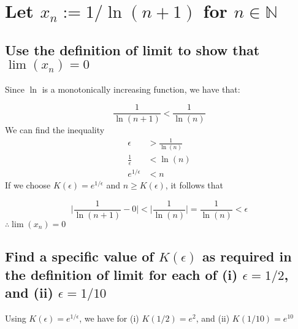 \documentclass{article}
\begin{document}
\section{Let $x_n := 1/\ln(n + 1)$ for $n \in \mathbb{N}$}
\subsection{Use the definition of limit to show that $\lim(x_n) = 0$}
Since $\ln$ is a monotonically increasing function, we have that:

\begin{equation*}
    \frac{1}{\ln(n + 1)} < \frac{1}{\ln(n)}
\end{equation*}
We can find the inequality 
\begin{align*}
    \epsilon & > \frac{1}{\ln(n)} \\
    \frac{1}{\epsilon} & < \ln(n) \\
    e^{1/\epsilon} & < n 
\end{align*}
If we choose $K(\epsilon) = e^{1/\epsilon}$ and $n \ge K(\epsilon)$, it follows that 

\begin{equation*}
    \Big| \frac{1}{\ln(n + 1)} - 0 \Big| < \Big| \frac{1}{\ln(n)} \Big| = \frac{1}{\ln(n)} < \epsilon
\end{equation*}
$\therefore \lim(x_n) = 0$

\subsection{Find a specific value of $K(\epsilon)$ as required in the definition of limit for each of (i) $\epsilon = 1/2$, and (ii) $\epsilon = 1/10$}
Using $K(\epsilon) = e^{1/\epsilon}$, we have for (i) $K(1/2) = e^2$, and (ii) $K(1/10) = e^{10}$
\end{document}
